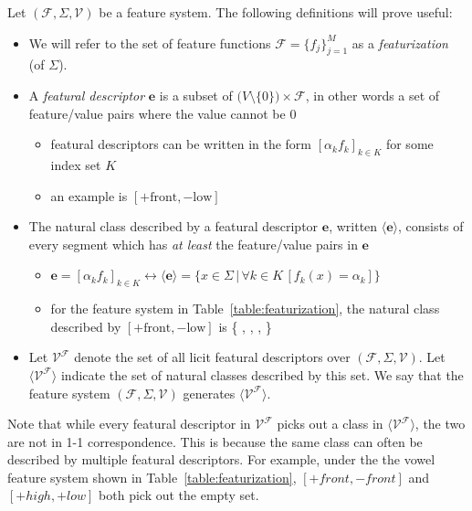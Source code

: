 \documentclass[11pt, oneside]{article}   	%
\begin{document}
\vspace{\baselineskip} \noindent Let $(\mathcal F, \Sigma, \mathcal V)$ be a feature system. The following definitions will prove useful: \begin{itemize}
    \item We will refer to the set of feature functions $\mathcal F = \{f_j\}_{j=1}^M$ as a \textit{featurization} (of $\Sigma$). 
    \item A \textit{featural descriptor} $\mathbf{e}$ is a subset of $\mathcal (V \setminus \{0\}) \times \mathcal F$, in other words a set of feature/value pairs where the value cannot be $0$ \begin{itemize}
        \item featural descriptors can be written in the form $[\alpha_k f_k]_{k \in K}$ for some index set $K$
        \item an example is $[+ \text{front}, - \text{low}]$
        \end{itemize}
    \item The natural class described by a featural descriptor $\mathbf{e}$, written $\langle \mathbf{e} \rangle$, consists of every segment which has \textit{at least} the feature/value pairs in $\mathbf{e}$ \begin{itemize}
        \item $\mathbf{e} = [\alpha_k f_k]_{k \in K} \leftrightarrow \langle \mathbf{e} \rangle = \{x \in \Sigma \, | \, \forall k \in K \, [ f_k(x) = \alpha_k ] \}$
        \item for the feature system in Table~\ref{table:featurization}, the natural class described by $[+ \text{front}, - \text{low}]$ is \{ , , , \textipa{\oe} \}
        \end{itemize}
    \item Let $\mathcal V^\mathcal F$ denote the set of all licit featural descriptors over $(\mathcal F, \Sigma, \mathcal V)$. Let $\langle \mathcal V^\mathcal F \rangle$ indicate the set of natural classes described by this set. We say that the feature system $(\mathcal F, \Sigma, \mathcal V)$ generates $\langle \mathcal V^\mathcal F \rangle$.
    \end {itemize}
    
Note that while every featural descriptor in $\mathcal V^\mathcal F$ picks out a class in $\langle \mathcal V^\mathcal F \rangle$, the two are not in 1-1 correspondence. This is because the same class can often be described by multiple featural descriptors. For example, under the the vowel feature system shown in Table~\ref{table:featurization}, $[+front, -front]$ and $[+high, +low]$ both pick out the empty set.
\end{document}

